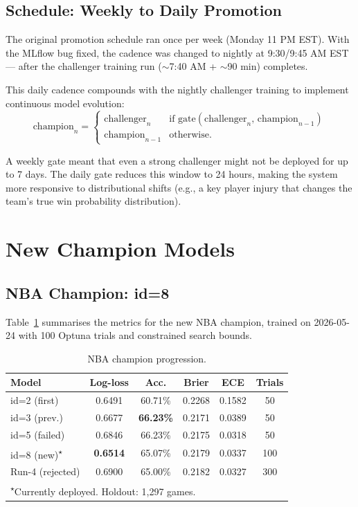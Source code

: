 \documentclass[conference]{IEEEtran}
\begin{document}
\subsection{Schedule: Weekly to Daily Promotion}
\label{subsec:schedule}

The original promotion schedule ran once per week (Monday 11 PM EST).
With the MLflow bug fixed, the cadence was changed to nightly at
9:30/9:45 AM EST — after the challenger training run
($\sim$7:40 AM + $\sim$90 min) completes.

This daily cadence compounds with the nightly challenger training to
implement continuous model evolution:
\begin{equation}
  \text{champion}_n =
  \begin{cases}
    \text{challenger}_n & \text{if gate}(\text{challenger}_n,\,\text{champion}_{n-1})\\
    \text{champion}_{n-1} & \text{otherwise.}
  \end{cases}
  \label{eq:continuous}
\end{equation}

A weekly gate meant that even a strong challenger might not be
deployed for up to 7 days.  The daily gate reduces this window to 24
hours, making the system more responsive to distributional shifts
(e.g., a key player injury that changes the team's true win
probability distribution).

\section{New Champion Models}
\label{sec:champions}

\subsection{NBA Champion: id=8}

Table~\ref{tab:id8} summarises the metrics for the new NBA champion,
trained on 2026-05-24 with 100 Optuna trials and constrained search
bounds.

\begin{table}[t]
\centering
\caption{NBA champion progression.}
\label{tab:id8}
\small
\begin{tabular}{lccccc}
\toprule
\textbf{Model} & \textbf{Log-loss} & \textbf{Acc.} & \textbf{Brier} & \textbf{ECE} & \textbf{Trials}\\
\midrule
id=2 (first)  & 0.6491 & 60.71\% & 0.2268 & 0.1582 & 50 \\
id=3 (prev.)  & 0.6677 & \textbf{66.23\%} & 0.2171 & 0.0389 & 50 \\
id=5 (failed) & 0.6846 & 66.23\% & 0.2175 & 0.0318 & 50 \\
id=8 (new)\textsuperscript{$\star$}
              & \textbf{0.6514} & 65.07\% & 0.2179 & 0.0337 & 100 \\
\midrule
Run-4 (rejected) & 0.6900 & 65.00\% & 0.2182 & 0.0327 & 300 \\
\bottomrule
\multicolumn{6}{l}{\textsuperscript{$\star$}Currently deployed. Holdout: 1,297 games.}
\end{tabular}
\end{table}
\end{document}

